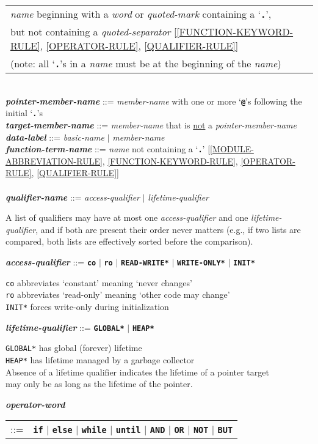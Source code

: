 \documentclass[12pt]{article}
\newcommand{\TT}[1]{{\tt \bfseries #1}}
\newcommand{\ttkey}[1]{{\tt \bfseries #1}}
\newcommand{\emkey}[1]{{\em \bfseries #1}}
\newcommand{\ttakey}[1]{{\tt \bfseries *#1*}}
\newenvironment{indpar}[1][0.3in]%
	{\begin{list}{}%
		     {\setlength{\itemsep}{0in}%
		      \setlength{\topsep}{0in}%
		      \setlength{\parsep}{1ex}%
		      \setlength{\labelwidth}{#1}%
		      \setlength{\leftmargin}{#1}%
		      \addtolength{\leftmargin}{\labelsep}}%
	 \item}%
	{\end{list}}
\begin{document}
\begin{indpar}
\begin{tabular}[t]{@{}l@{}}
                        {\em name} beginning with a {\em word} or
			{\em quoted-mark} containing a `\TT{.}', \\
			but not containing a {\em quoted-separator}
			[\ref{FUNCTION-KEYWORD-RULE},
			 \ref{OPERATOR-RULE},
			 \ref{QUALIFIER-RULE}] \\
			(note: all `\TT{.}'s in a {\em name} must be at
			 the beginning of the {\em name})
			\end{tabular} \\
\emkey{pointer-member-name}\label{POINTER-MEMBER-NAME} ::=
    {\em member-name} with one or more `\TT{@}'s
    following the initial `\TT{.}'s \\
\emkey{target-member-name}\label{TARGET-MEMBER-NAME} ::=
    {\em member-name} that is \underline{not} a {\em pointer-member-name}
\\[1ex]
\emkey{data-label}\label{DATA-LABEL} ::=
    {\em basic-name} $|$ {\em member-name}
\\[1ex]
\emkey{function-term-name} ::= {\em name} not containing a `\TT{.}'
    \label{FUNCTION-TERM-NAME}
	[\ref{MODULE-ABBREVIATION-RULE},
	 \ref{FUNCTION-KEYWORD-RULE},
	 \ref{OPERATOR-RULE},
	 \ref{QUALIFIER-RULE}] \\
\\[1ex]
\emkey{qualifier-name}\label{QUALIFIER-NAME}
    ::= {\em access-qualifier} $|$ {\em lifetime-qualifier}
\begin{indpar}
A list of qualifiers may have at most one {\em access-qualifier}
and one {\em lifetime-qualifier}, and if both are present their
order never matters (e.g., if two lists are compared, both lists
are effectively sorted before the comparison).
\end{indpar}

\emkey{access-qualifier}\label{ACCESS-QUALIFIER}
    ::= \ttkey{co} $|$ \ttkey{ro} $|$ \ttakey{READ-WRITE}
                   $|$ \ttakey{WRITE-ONLY} $|$ \ttakey{INIT}
\begin{indpar}
{\tt co} abbreviates `constant' meaning `never changes' \\
{\tt ro} abbreviates `read-only' meaning `other code may change' \\
{\tt *INIT*} forces write-only during initialization
\end{indpar}

\emkey{lifetime-qualifier}\label{LIFETIME-QUALIFIER}
    ::= \ttakey{GLOBAL} $|$ \ttakey{HEAP}
\begin{indpar}
{\tt *GLOBAL*} has global (forever) lifetime \\
{\tt *HEAP*} has lifetime managed by a garbage collector \\
Absence of a lifetime qualifier indicates the lifetime of a pointer target \\
may only be as long as the lifetime of the pointer.
\end{indpar}
\emkey{operator-word}
    \begin{tabular}[t]{rl}
    ::= & \TT{if} $|$ \TT{else} $|$ \TT{while} $|$ \TT{until}
                  $|$ \TT{AND} $|$ \TT{OR}
		  $|$ \TT{NOT} $|$ \TT{BUT}
    \end{tabular}


\end{indpar}
\end{document}
